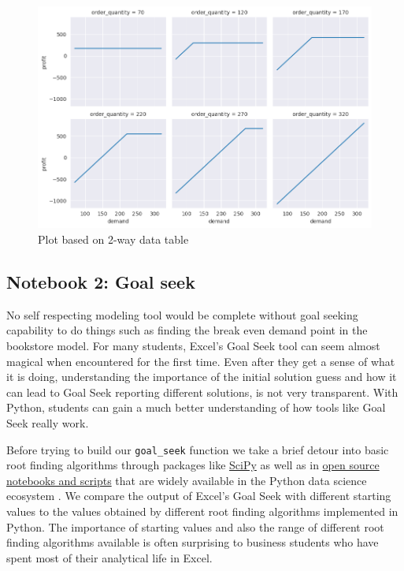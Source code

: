 \documentclass[ited,blindrev]{informs3}              %
\newcommand{\code}[1]{\texttt{#1}}
\begin{document}
\begin{figure}[!ht]
	\centering
	\begin{minipage}{.80\textwidth}
		\includegraphics[width=1.0\textwidth]{images/two_way_dt.png}
	\end{minipage}
	\caption{Plot based on 2-way data table}
	\label{fig:2way_dt}
\end{figure}


\subsection{Notebook 2: Goal seek}

No self respecting modeling tool would be complete without goal seeking capability to do things such as finding the break even demand point in the bookstore model. For many students, Excel's Goal Seek tool can seem almost magical when encountered for the first time. Even after they get a sense of what it is doing, understanding the importance of the initial solution guess and how it can lead to Goal Seek reporting different solutions, is not very transparent. With Python, students can gain a much better understanding of how tools like Goal Seek really work. 

Before trying to build our \code{goal\_seek} function we take a brief detour into basic root finding algorithms through packages like \href{https://docs.scipy.org/doc/scipy/tutorial/optimize.html#root-finding}{SciPy} \cite{SciPy} as well as in \href{https://github.com/patrickwalls/mathematical-python/}{open source notebooks and scripts} that are widely available in the Python data science ecosystem \cite{wallsMathematicalPython2023}. We compare the output of Excel's Goal Seek with different starting values to the values obtained by different root finding algorithms implemented in Python. The importance of starting values and also the range of different root finding algorithms available is often surprising to business students who have spent most of their analytical life in Excel.
\end{document}
